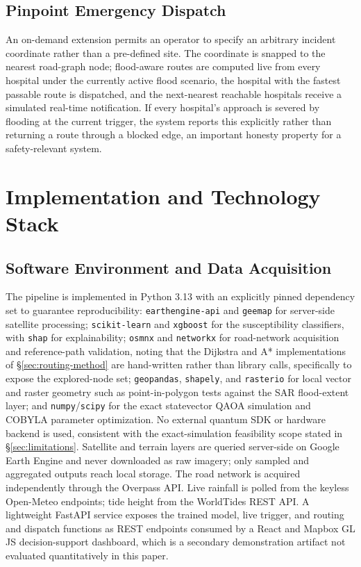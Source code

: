 \documentclass[conference]{IEEEtran}
\begin{document}
\subsection{Pinpoint Emergency Dispatch}
An on-demand extension permits an operator to specify an arbitrary incident coordinate rather than a pre-defined site. The coordinate is snapped to the nearest road-graph node; flood-aware routes are computed live from every hospital under the currently active flood scenario, the hospital with the fastest passable route is dispatched, and the next-nearest reachable hospitals receive a simulated real-time notification. If every hospital's approach is severed by flooding at the current trigger, the system reports this explicitly rather than returning a route through a blocked edge, an important honesty property for a safety-relevant system.

\section{Implementation and Technology Stack}
\label{sec:implementation}

\subsection{Software Environment and Data Acquisition}
The pipeline is implemented in Python 3.13 with an explicitly pinned dependency set to guarantee reproducibility: \texttt{earthengine-api} and \texttt{geemap} for server-side satellite processing; \texttt{scikit-learn} and \texttt{xgboost} for the susceptibility classifiers, with \texttt{shap} for explainability; \texttt{osmnx} and \texttt{networkx} for road-network acquisition and reference-path validation, noting that the Dijkstra and A* implementations of \S\ref{sec:routing-method} are hand-written rather than library calls, specifically to expose the explored-node set; \texttt{geopandas}, \texttt{shapely}, and \texttt{rasterio} for local vector and raster geometry such as point-in-polygon tests against the SAR flood-extent layer; and \texttt{numpy}/\texttt{scipy} for the exact statevector QAOA simulation and COBYLA parameter optimization. No external quantum SDK or hardware backend is used, consistent with the exact-simulation feasibility scope stated in \S\ref{sec:limitations}. Satellite and terrain layers are queried server-side on Google Earth Engine \cite{gorelick2017} and never downloaded as raw imagery; only sampled and aggregated outputs reach local storage. The road network is acquired independently through the Overpass API. Live rainfall is polled from the keyless Open-Meteo endpoints; tide height from the WorldTides REST API. A lightweight FastAPI service exposes the trained model, live trigger, and routing and dispatch functions as REST endpoints consumed by a React and Mapbox GL JS decision-support dashboard, which is a secondary demonstration artifact not evaluated quantitatively in this paper.
\end{document}
